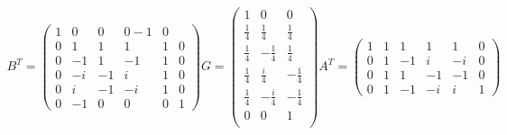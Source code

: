 \begin{align}

B^T = 
\begin{pmatrix}
  1 & 0 & 0 & 0 -1 & 0 \\
  0 & 1 & 1 & 1 & 1 & 0\\
  0 & -1 & 1 & -1 & 1 & 0 \\
  0 & -i & -1 & i & 1 & 0 \\
  0 & i & -1 & -i & 1 & 0 \\
  0 & -1 & 0 & 0 & 0 & 1
\end{pmatrix}

G = 
\begin{pmatrix}
  1 & 0 & 0 \\
  \frac{1}{4} & \frac{1}{4} & \frac{1}{4} \\
  \frac{1}{4} & -\frac{1}{4} & \frac{1}{4} \\
  \frac{1}{4} & \frac{i}{4} & -\frac{1}{4} \\
  \frac{1}{4} & -\frac{i}{4} & -\frac{1}{4} \\
  0 & 0 & 1 \\
\end{pmatrix}

A^T = 
\begin{pmatrix}
  1 & 1 & 1 & 1 &1 &0\\ 
  0 & 1 & −1 & i & −i & 0\\
  0 & 1 & 1 & −1 & −1 & 0\\
  0 & 1 & −1 & −i & i & 1
\end{pmatrix}

\end{align}